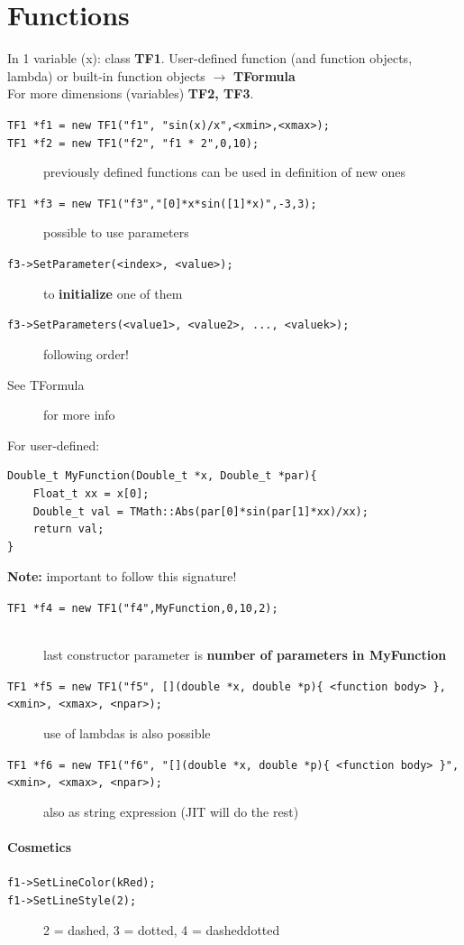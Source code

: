 \documentclass[10pt, twoside]{article}
\newcommand{\ttt}[1]{\colorbox{boxgray}{\texttt{#1}}}
\begin{document}
\section{Functions}
In 1 variable (x): class \textbf{TF1}. User-defined function (and function objects, lambda) or built-in function objects $\rightarrow$ \textbf{TFormula}
\\For more dimensions (variables) \textbf{TF2, TF3}.
\begin{description}
\item[\ttt{TF1 *f1 = new TF1("f1", "sin(x)/x",<xmin>,<xmax>);}]
\item[\ttt{TF1 *f2 = new TF1("f2", "f1 * 2",0,10);}] previously defined functions can be used in definition of new ones
\item[\ttt{TF1 *f3 = new TF1("f3","[0]*x*sin([1]*x)",-3,3);}] possible to use parameters
\item[\ttt{f3->SetParameter(<index>, <value>);}] to \textbf{initialize} one of them
\item[\ttt{f3->SetParameters(<value1>, <value2>, ..., <valuek>);}] following order!
\item[See TFormula] for more info
\end{description}
For user-defined:
\begin{verbatim}
Double_t MyFunction(Double_t *x, Double_t *par){ 
    Float_t xx = x[0];
    Double_t val = TMath::Abs(par[0]*sin(par[1]*xx)/xx); 
    return val;
}
\end{verbatim}
\textbf{Note:} important to follow this signature!
\begin{description}
\item[\ttt{TF1 *f4 = new TF1("f4",MyFunction,0,10,2);}] {}\,\\
last constructor parameter is \textbf{number of parameters in MyFunction}
\item[\ttt{TF1 *f5 = new TF1("f5", [](double *x, double *p)\{ <function body> \}, <xmin>, <xmax>, <npar>);}] use of lambdas is also possible
\item[\ttt{TF1 *f6 = new TF1("f6", "[](double *x, double *p)\{ <function body> \}", <xmin>, <xmax>, <npar>);}] also as string expression (JIT will do the rest)
\end{description}
\paragraph{Cosmetics}
\begin{description}
\item[\ttt{f1->SetLineColor(kRed);}]
\item[\ttt{f1->SetLineStyle(2);}] 2 = dashed, 3 = dotted, 4 = dasheddotted
\end{description}
\end{document}
